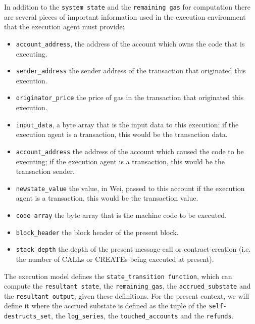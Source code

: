 \documentclass[10pt,letterpaper,leqno,bibliography=totoc]{scrartcl}
\newenvironment{alphafootnotes}
{\par\edef\savedfootnotenumber{\number\value{footnote}}
\renewcommand{\thefootnote}{\alph{footnote}}
\setcounter{footnote}{0}}
{\par\setcounter{footnote}{\savedfootnotenumber}}
\begin{document}
\begin{alphafootnotes}
\begin{multicols*}{2}
				In addition to the \texttt{system state} and the \texttt{remaining gas} for computation there are several pieces of important information used in the execution environment that the execution agent must provide:

				\begin{itemize}
					\item \texttt{account\_address}, the address of the account which owns the code that is executing.
					\item \texttt{sender\_address} the sender address of the transaction that originated this execution.
					\item \texttt{originator\_price} the price of gas in the transaction that originated this execution.
					\item \texttt{input\_data}, a byte array that is the input data to this execution; if the execution agent is a transaction, this would be the transaction data.
					\item \texttt{account\_address}  the address of the account which caused the code to be executing; if the execution agent is a transaction, this would be the transaction sender.
					\item \texttt{newstate\_value} the value, in Wei, passed to this account if the execution agent is a transaction, this would be the transaction value.\supercite{Wood2017}
					\item \texttt{code array} the byte array that is the machine code to be executed.\supercite{Wood2017}
					\item \texttt{block\_header} the block header of the present block.
					\item \texttt{stack\_depth} the depth of the present message-call or contract-creation (i.e. the number of {\small CALL}s or {\small CREATE}s being executed at present).\supercite{Wood2017}
				\end{itemize}

				The execution model defines the \texttt{state\_transition function}, which can compute the \texttt{resultant state}, the \texttt{remaining\_gas}, the \texttt{accrued\_substate} and the \texttt{resultant\_output}, given these definitions. For the present context, we will define it where the accrued substate is defined as the tuple of the \texttt{self-destructs\_set}, the \texttt{log\_series}, the \texttt{touched\_accounts} and the \texttt{refunds}.\supercite{Wood2017}


\end{multicols*}
\end{alphafootnotes}
\end{document}

